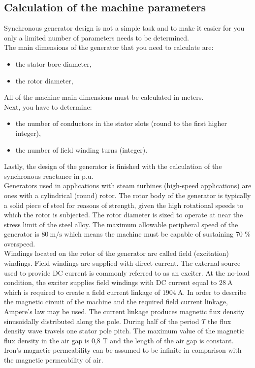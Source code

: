 \documentclass{article}
\begin{document}
\subsection{Calculation of the machine parameters}
Synchronous generator design is not a simple task and to make it easier for you only a limited  number of parameters needs to be determined. 
\\The main dimensions of the generator that you need to calculate are:
\begin{itemize}
    \item the stator bore diameter,
    \item the rotor diameter,
\end{itemize}
All of the machine main dimensions must be calculated in meters.
\\Next, you have to determine:
\begin{itemize}
    \item the number of conductors in the stator slots (round to the first higher integer),
    \item the number of field winding turns (integer).
\end{itemize} 
Lastly, the design of the generator is finished with the calculation of the synchronous reactance in p.u. 
\\Generators used in applications with steam turbines (high-speed applications) are ones with a cylindrical (round) rotor. The rotor body of the generator is typically a solid piece of steel for reasons of strength, given the high rotational speeds to which the rotor is subjected. The rotor diameter is sized to operate at near the stress limit of the steel alloy. The maximum allowable peripheral speed of the generator is $80\ \mathrm{m/s}$ which means the machine must be capable of sustaining 70 \% overspeed. 
\\Windings located on the rotor of the generator are called field (excitation) windings. Field windings are supplied with direct current. The external source used to provide DC current is commonly referred to as an exciter. At the no-load condition, the exciter supplies field windings with DC current equal to $28\ \mathrm{A}$ which is required to create a field current linkage of $1904\ \mathrm{A}$. In order to describe the magnetic circuit of the machine and the required field current linkage, Ampere's law may be used. The current linkage produces magnetic flux density sinusoidally distributed along the pole. During half of the period $T$ the flux density wave travels one stator pole pitch. The maximum value of the magnetic flux density in the air gap is 0,8 T and the length of the air gap is constant. Iron's magnetic permeability can be assumed to be infinite in comparison with the magnetic permeability of air. 
\end{document}
